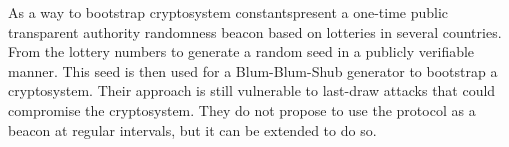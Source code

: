 \item[Trap me if you can --- Million dollar Curve]
As a way to bootstrap cryptosystem constants\citet{baigneres2015trap}present a one-time public transparent authority randomness beacon based on lotteries in several countries. From the lottery numbers to generate a random seed in a publicly verifiable manner. This seed is then used for a Blum-Blum-Shub generator to bootstrap a cryptosystem. Their approach is still vulnerable to last-draw attacks that could compromise the cryptosystem. They do not propose to use the protocol as a beacon at regular intervals, but it can be extended to do so. 